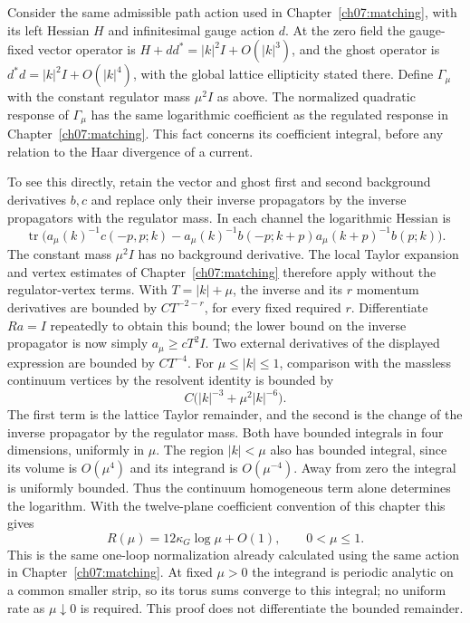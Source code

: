 Consider the same admissible path action used in Chapter~\ref{ch07:matching},
with its left Hessian $H$ and infinitesimal gauge action $d$.
At the zero field the gauge-fixed vector operator is
$H+dd^*=|k|^2I+O(|k|^3)$, and the ghost operator is
$d^*d=|k|^2I+O(|k|^4)$, with the global lattice ellipticity stated there.
Define $\Gamma_\mu$ with the constant regulator mass $\mu^2I$ as above.
The normalized quadratic response of $\Gamma_\mu$ has the same logarithmic
coefficient as the regulated response in Chapter~\ref{ch07:matching}.
This fact concerns its coefficient integral, before any relation to the
Haar divergence of a current.

To see this directly, retain the vector and ghost first and second
background derivatives $b,c$ and replace only their inverse propagators by the
inverse propagators with the regulator mass. In each channel the logarithmic Hessian is
\[
 \operatorname{tr}\bigl(a_\mu(k)^{-1}c(-p,p;k)
 -a_\mu(k)^{-1}b(-p;k+p)a_\mu(k+p)^{-1}b(p;k)\bigr).
\]
The constant mass $\mu^2I$ has no background derivative. The local Taylor
expansion and vertex estimates of Chapter~\ref{ch07:matching} therefore
apply without the regulator-vertex terms. With $T=|k|+\mu$, the
inverse and its $r$ momentum derivatives are bounded by $CT^{-2-r}$, for every
fixed required $r$. Differentiate $Ra=I$ repeatedly to obtain this bound;
the lower bound on the inverse propagator is now simply $a_\mu\ge cT^2I$.
Two external derivatives of the displayed expression are bounded by
$CT^{-4}$. For $\mu\le|k|\le1$, comparison with the massless continuum
vertices by the resolvent identity is bounded by
\[
 C\bigl(|k|^{-3}+\mu^2|k|^{-6}\bigr).
\]
The first term is the lattice Taylor remainder, and the second
is the change of the inverse propagator by the regulator mass. Both have bounded integrals
in four dimensions, uniformly in $\mu$. The region $|k|<\mu$ also
has bounded integral, since its volume is $O(\mu^4)$ and its integrand
is $O(\mu^{-4})$. Away from zero the integral is uniformly bounded.
Thus the continuum homogeneous term alone determines the logarithm.
With the twelve-plane coefficient convention of this chapter this gives
\begin{equation}
 R(\mu)=12\kappa_G\log\mu+O(1),\qquad0<\mu\le1.
 \label{ch17:scalar-log-supplier}
\end{equation}
This is the same one-loop normalization already calculated using the
same action in Chapter~\ref{ch07:matching}. At fixed $\mu>0$ the
integrand is periodic analytic on a common smaller strip, so its torus
sums converge to this integral; no uniform rate as $\mu\downarrow0$
is required. This proof does not differentiate the bounded remainder.

